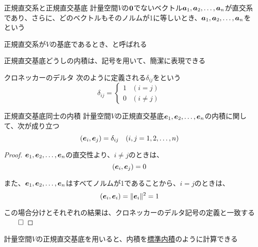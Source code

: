 \documentclass[../../../topic_linear-algebra]{subfiles}
\begin{document}
\begin{definition}{正規直交系と正規直交基底}
  計量空間$V$の$\vb*{0}$でないベクトル$\vb*{a}_1, \vb*{a}_2, \ldots, \vb*{a}_n$が直交系であり、さらに、どのベクトルもそのノルムが1に等しいとき、$\vb*{a}_1, \vb*{a}_2, \ldots, \vb*{a}_n$をという

  正規直交系が$V$の基底であるとき、と呼ばれる
\end{definition}

\sectionline

正規直交基底どうしの内積は、記号を用いて、簡潔に表現できる

\begin{definition}{クロネッカーのデルタ}
  次のように定義される$\delta_{ij}$をという
  \begin{equation*}
    \delta_{ij} =
    \begin{cases}
      1 & (i=j)      \\
      0 & (i \neq j)
    \end{cases}
  \end{equation*}
\end{definition}

\begin{theorem}{正規直交基底同士の内積}
  計量空間$V$の正規直交基底$\vb*{e}_1, \vb*{e}_2, \ldots, \vb*{e}_n$の内積に関して、次が成り立つ
  \begin{equation*}
    (\vb*{e}_i, \vb*{e}_j) = \delta_{ij} \quad (i,j=1,2,\ldots,n)
  \end{equation*}
\end{theorem}

\begin{proof}
  $\vb*{e}_1, \vb*{e}_2, \ldots, \vb*{e}_n$の直交性より、$i \neq j$のときは、
  \begin{equation*}
    (\vb*{e}_i, \vb*{e}_j) = 0
  \end{equation*}

  また、$\vb*{e}_1, \vb*{e}_2, \ldots, \vb*{e}_n$はすべてノルムが1であることから、$i=j$のときは、
  \begin{equation*}
    (\vb*{e}_i, \vb*{e}_i) = \|\vb*{e}_i\|^2 = 1
  \end{equation*}

  この場合分けとそれぞれの結果は、クロネッカーのデルタ記号の定義と一致する $\qed$
\end{proof}

\sectionline

計量空間$V$の正規直交基底を用いると、内積を\hyperref[def:standard-inner-product-Cn]{標準内積}のように計算できる
\end{document}
